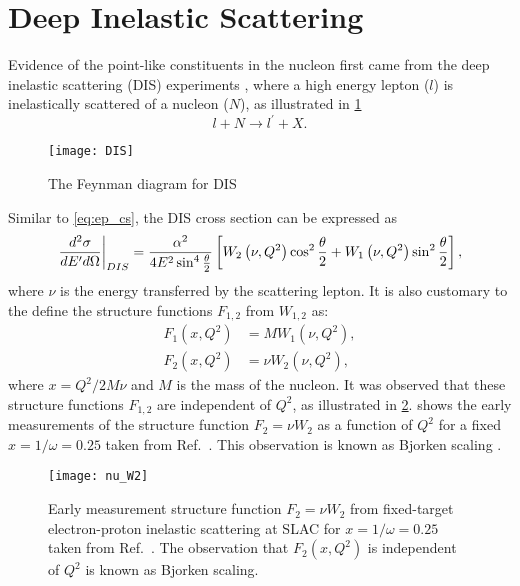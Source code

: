 \documentclass[../main.tex]{subfiles}
\begin{document}
\section{Deep Inelastic Scattering}
\label{sec:dis}
Evidence of the point-like constituents in the nucleon first came from the deep
inelastic scattering (DIS) experiments \cite{breidenbach1969}, where a high
energy lepton ($l$) is inelastically scattered of a nucleon ($N$), as
illustrated in \cref{fig:DIS}
\begin{equation}
	l + N \rightarrow l^\prime + X.
\end{equation}
\begin{figure}[htbp!]
	\centering
	\texttt{[image: DIS]}
	\caption{The Feynman diagram for DIS}
	\label{fig:DIS}
\end{figure}
Similar to \cref{eq:ep_cs}, the DIS cross section can be expressed as
\begin{equation}
	\eval{\frac{d^2\sigma}{dE^\prime d\Omega}}_{DIS} = \frac{\alpha^2}{4E^2 \sin^4
		\frac{\theta}{2}} \left[ W_2\left(\nu,Q^2\right)\cos^2
		\frac{\theta}{2} + W_1\left(\nu,Q^2\right)\sin^2 \frac{\theta}{2}
		\right],
	\label{eq:DIS_cs1}
\end{equation}
where $\nu$ is the energy transferred by the scattering lepton. It is also
customary to the define the structure functions $F_{1,2}$ from $W_{1,2}$ as:
\begin{equation}
	\begin{split}
		F_1\left(x,Q^2\right) &= MW_1\left(\nu,Q^2\right),\\
		F_2\left(x,Q^2\right) &= \nu W_2\left(\nu,Q^2\right),
	\end{split}
\end{equation}
where $x=Q^2/2M\nu$ and $M$ is the mass of the nucleon. It was observed that
these structure functions $F_{1,2}$ are independent of $Q^2$, as illustrated in
\cref{fig:w2}.  shows the early measurements of the
structure function $F_2=\nu W_2$ as a function of $Q^2$ for a fixed
$x=1/\omega=0.25$ taken from Ref.~\cite{friedman1972}. This observation is
known as Bjorken scaling \cite{bjorken1969}.
\begin{figure}[htpb!]
	\centering
	\texttt{[image: nu\_W2]}
	\caption{Early measurement structure function $F_2=\nu W_2$ from
		fixed-target electron-proton inelastic scattering at SLAC for
		$x=1/\omega=0.25$ taken from Ref.~\cite{friedman1972}. The observation
		that $F_2(x,Q^2)$ is independent of $Q^2$ is known as Bjorken scaling. }
	\label{fig:w2}
\end{figure}
\end{document}
